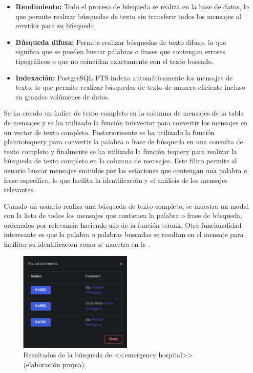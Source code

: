 \begin{itemize}
	\item \textbf{Rendimiento:} Todo el proceso de búsqueda se realiza en la base de datos, lo que permite realizar búsquedas de texto sin transferir todos los mensajes al servidor para su búsqueda.
	\item \textbf{Búsqueda difusa:} Permite realizar búsquedas de texto difuso, lo que significa que se pueden buscar palabras o frases que contengan errores tipográficos o que no coincidan exactamente con el texto buscado.
	\item \textbf{Indexación:} PostgreSQL FTS indexa automáticamente los mensajes de texto, lo que permite realizar búsquedas de texto de manera eficiente incluso en grandes volúmenes de datos.
\end{itemize}

Se ha creado un índice de texto completo en la columna de mensajes de la tabla de mensajes y se ha utilizado la función to\textunderscore tsvector para convertir los mensajes en un vector de texto completo. Posteriormente se ha utilizado la función plainto\textunderscore tsquery para convertir la palabra o frase de búsqueda en una consulta de texto completo y finalmente se ha utilizado la función ts\textunderscore query para realizar la búsqueda de texto completo en la columna de mensajes. Este filtro permite al usuario buscar mensajes emitidos por las estaciones que contengan una palabra o frase específica, lo que facilita la identificación y el análisis de los mensajes relevantes.

Cuando un usuario realiza una búsqueda de texto completo, se muestra un modal con la lista de todos los mensajes que contienen la palabra o frase de búsqueda, ordenados por relevancia haciendo uso de la función ts\textunderscore rank. Otra funcionalidad interesante es que la palabra o palabras buscadas se resaltan en el mensaje para facilitar su identificación como se muestra en la .

\begin{figure}[h]
	\centering
	\includegraphics[width=0.5\textwidth]{Imagenes/Chapter_4/fts_output.png}
	\caption[Resultados de la búsqueda de <<emergency hospital>>.]{Resultados de la búsqueda de <<emergency hospital>> (elaboración propia).}
	\label{fig:postgres-fts}
\end{figure}

